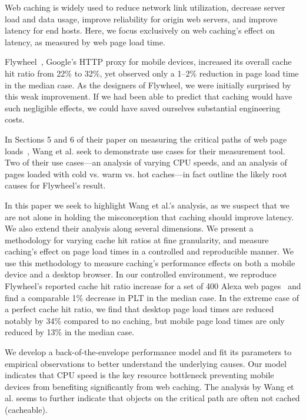 \label{intro}
Web caching is widely used to reduce network link utilization, decrease server load and data usage, improve reliability for origin web servers, and improve latency for end hosts.
Here, we focus exclusively on web caching's effect on latency, as measured by web page load time.

Flywheel~\cite{flywheel}, Google's HTTP proxy for mobile devices, increased
its overall cache hit ratio from 22\% to 32\%, yet observed only a 1--2\% reduction in page load time in the median case.
As the designers of Flywheel, we were initially surprised by this weak
improvement. If we had been able to predict that caching would have such
negligible effects, we could have saved ourselves substantial engineering costs. %

In Sections 5 and 6 of their paper on measuring the critical paths of web page 
loads~\cite{wang2013demystifying}, Wang et al. seek to demonstrate use 
cases for their measurement tool. Two of their use cases---an analysis of
varying CPU speeds, and an analysis of pages loaded with cold vs. warm vs. hot caches---in fact outline the likely root causes for Flywheel's result.

In this paper we seek to highlight Wang et al.'s analysis, as we suspect that
we are not alone in holding the misconception that caching should
improve latency. We also extend
their analysis along several dimensions. We present 
a methodology for varying cache hit ratios at fine granularity,
and measure caching's effect on page load times in a controlled and 
reproducible manner.
We use this methodology to measure caching's performance effects on both a mobile device and a desktop browser.
In our controlled environment, we reproduce Flywheel's reported cache hit
ratio increase for
a set of
400 Alexa web pages~\cite{alexa} and find a comparable 1\% decrease in PLT in the median
case.
In the extreme case of a perfect cache hit ratio, we find that desktop page load times are reduced notably by 34\% compared to no caching, but mobile page load times are only reduced by 13\% in the median case.

We develop a back-of-the-envelope performance model and fit its parameters to
empirical observations to better understand the underlying causes.
Our model indicates that CPU speed is the key resource bottleneck preventing mobile devices from benefiting significantly from web caching. 
The analysis by Wang et al. seems to further indicate that objects on the critical path are often not cached (cacheable).

